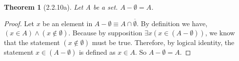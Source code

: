 \documentclass[a4paper, 12pt]{article}
\theoremstyle{plain}
\newtheorem*{theorem*}{Theorem}
\begin{document}
	
	\begin{theorem*}[2.2.10a]
		Let A be a set. $A - \emptyset = A$.
	\end{theorem*}
	
	\begin{proof}
		Let $x$ be an element in $A - \emptyset \equiv A \cap \overline{\emptyset}$. By definition we have, \newline $(x \in A) \land (x \notin \emptyset)$. Because by supposition $\exists x (x \in (A - \emptyset))$, we know that the statement $(x \notin \emptyset)$ must be true. Therefore, by logical identity, the statement $x \in (A - \emptyset)$ is defined as $x \in A$. So $A - \emptyset = A.$
	\end{proof}
\end{document}
